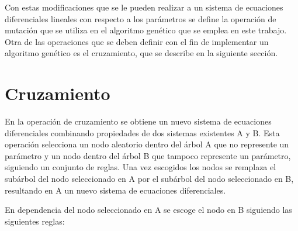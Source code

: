 
Con estas modificaciones que se le pueden realizar a un sistema de ecuaciones diferenciales lineales con respecto a los parámetros se define la operación de mutación que se utiliza en el algoritmo genético que se emplea en este trabajo. Otra de las operaciones que se deben definir con el fin de implementar un algoritmo genético es el cruzamiento, que se describe en la siguiente sección.

\section{Cruzamiento}\label{section:xcross}

En la operación de cruzamiento se obtiene un nuevo sistema de ecuaciones diferenciales combinando propiedades de dos sistemas existentes A y B. Esta operación selecciona un nodo aleatorio dentro del árbol A que no represente un parámetro y un nodo dentro del árbol B que tampoco represente un parámetro, siguiendo un conjunto de reglas. Una vez escogidos los nodos se remplaza el subárbol del nodo seleccionado en A por el subárbol del nodo seleccionado en B, resultando en A un nuevo sistema de ecuaciones diferenciales.

En dependencia del nodo seleccionado en A se escoge el nodo en B siguiendo las siguientes reglas:



